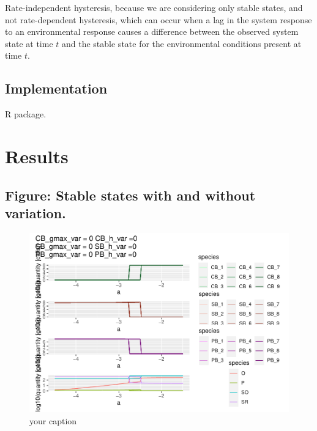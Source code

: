 \documentclass{article}
\begin{document}
Rate-independent hysteresis, because we are considering only stable
states, and not rate-dependent hysteresis, which can occur when a lag in
the system response to an environmental response causes a difference
between the observed system state at time \(t\) and the stable state for
the environmental conditions present at time \(t\).

\hypertarget{implementation}{%
\subsection{Implementation}\label{implementation}}

R package.

\hypertarget{results}{%
\section{Results}\label{results}}

\hypertarget{figure-stable-states-with-and-without-variation.}{%
\subsection{Figure: Stable states with and without
variation.}\label{figure-stable-states-with-and-without-variation.}}

\begin{figure}

{\centering \includegraphics[width=1\linewidth]{article_files/figure-latex/ss_novar-1} 

}

\caption{your caption}\label{fig:ss_novar}
\end{figure}
\end{document}
